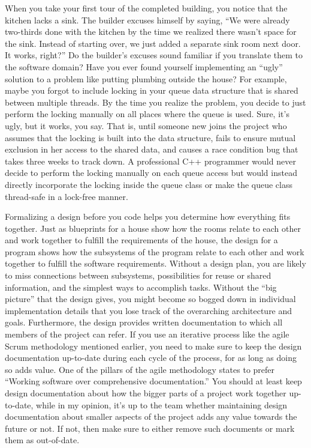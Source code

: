 When you take your first tour of the completed building, you notice that the kitchen lacks a sink. The builder excuses himself by saying, “We were already two-thirds done with the kitchen by the time we realized there wasn’t space for the sink. Instead of starting over, we just added a separate sink room next door. It works, right?” Do the builder’s excuses sound familiar if you translate them to the software domain? Have you ever found yourself implementing an “ugly” solution to a problem like putting plumbing outside the house? For example, maybe you forgot to include locking in your queue data structure that is shared between multiple threads. By the time you realize the problem, you decide to just perform the locking manually on all places where the queue is used. Sure, it’s ugly, but it works, you say. That is, until someone new joins the project who assumes that the locking is built into the data structure, fails to ensure mutual exclusion in her access to the shared data, and causes a race condition bug that takes three weeks to track down. A professional C++ programmer would never decide to perform the locking manually on each queue access but would instead directly incorporate the locking inside the queue class or make the queue class thread-safe in a lock-free manner.

Formalizing a design before you code helps you determine how everything fits together. Just as blueprints for a house show how the rooms relate to each other and work together to fulfill the requirements of the house, the design for a program shows how the subsystems of the program relate to each other and work together to fulfill the software requirements. Without a design plan, you are likely to miss connections between subsystems, possibilities for reuse or shared information, and the simplest ways to accomplish tasks. Without the “big picture” that the design gives, you might become so bogged down in individual implementation details that you lose track of the overarching architecture and goals. Furthermore, the design provides written documentation to which all members of the project can refer. If you use an iterative process like the agile Scrum methodology mentioned earlier, you need to make sure to keep the design documentation up-to-date during each cycle of the process, for as long as doing so adds value. One of the pillars of the agile methodology states to prefer “Working software over comprehensive documentation.” You should at least keep design documentation about how the bigger parts of a project work together up-to-date, while in my opinion, it’s up to the team whether maintaining design documentation about smaller aspects of the project adds any value towards the future or not. If not, then make sure to either remove such documents or mark them as out-of-date.


